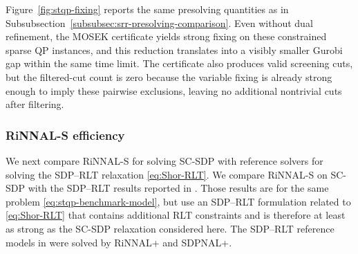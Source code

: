 \documentclass[11pt]{article}
\theoremstyle{plain}
\begin{document}
Figure~\ref{fig:stqp-fixing} reports the same presolving quantities as in Subsubsection~\ref{subsubsec:srr-presolving-comparison}. Even without dual refinement, the MOSEK certificate yields strong fixing on these constrained sparse QP instances, and this reduction translates into a visibly smaller Gurobi gap within the same time limit. The certificate also produces valid screening cuts, but the filtered-cut count is zero because the variable fixing is already strong enough to imply these pairwise exclusions, leaving no additional nontrivial cuts after filtering.

\subsubsection{RiNNAL-S efficiency}\label{subsubsec:stqp-rinnal-efficiency}

{We next compare RiNNAL-S for solving SC-SDP with reference solvers for solving the SDP--RLT relaxation \eqref{eq:Shor-RLT}.} We compare RiNNAL-S on SC-SDP with the SDP--RLT results reported in \cite{RiNNALplus}. Those results are for the same problem \eqref{eq:stqp-benchmark-model}, but use an SDP--RLT formulation related to \eqref{eq:Shor-RLT} that contains additional RLT constraints and is therefore at least as strong as the SC-SDP relaxation considered here. The SDP--RLT reference models in \cite{RiNNALplus} were solved by RiNNAL+ and SDPNAL+.
\end{document}
